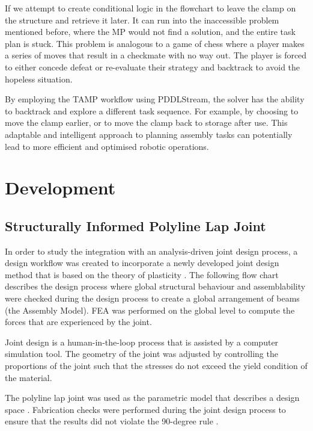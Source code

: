


If we attempt to create conditional logic in the flowchart to leave the clamp on the structure and retrieve it later. It can run into the inaccessible problem mentioned before, where the MP would not find a solution, and the entire task plan is stuck. This problem is analogous to a game of chess where a player makes a series of moves that result in a checkmate with no way out. The player is forced to either concede defeat or re-evaluate their strategy and backtrack to avoid the hopeless situation.

By employing the TAMP workflow using PDDLStream, the solver has the ability to backtrack and explore a different task sequence. For example, by choosing to move the clamp earlier, or to move the clamp back to storage after use. This adaptable and intelligent approach to planning assembly tasks can potentially lead to more efficient and optimised robotic operations.

\section{Development}
\label{section:exploration_5_development}

\subsection{Structurally Informed Polyline Lap Joint}
\label{subsection:exploration_5_structurally_informed_polyline_lap_joint}

In order to study the integration with an analysis-driven joint design process, a design workflow was created to incorporate a newly developed joint design method that is based on the theory of plasticity \parencite{tanadiniLimitAnalysisTimber2023}. The following flow chart describes the design process where global structural behaviour and assemblability were checked during the design process to create a global arrangement of beams (the Assembly Model). FEA was performed on the global level to compute the forces that are experienced by the joint. 

Joint design is a human-in-the-loop process that is assisted by a computer simulation tool. The geometry of the joint was adjusted by controlling the proportions of the joint such that the stresses do not exceed the yield condition of the material.




The polyline lap joint was used as the parametric model that describes a design space . Fabrication checks were performed during the joint design process to ensure that the results did not violate the 90-degree rule . 

